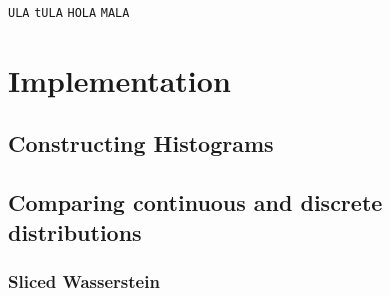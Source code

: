 \texttt{ULA} \cite{dalalyan2019user}
\texttt{tULA} \cite{Brosse18tULA}
\texttt{HOLA} \cite{Sabanis18tHOLA}
\texttt{MALA} \cite{bou2013nonasymptotic}



\section{Implementation}
\subsection{Constructing Histograms}
\subsection{Comparing continuous and discrete distributions}
\subsubsection{Sliced Wasserstein}


